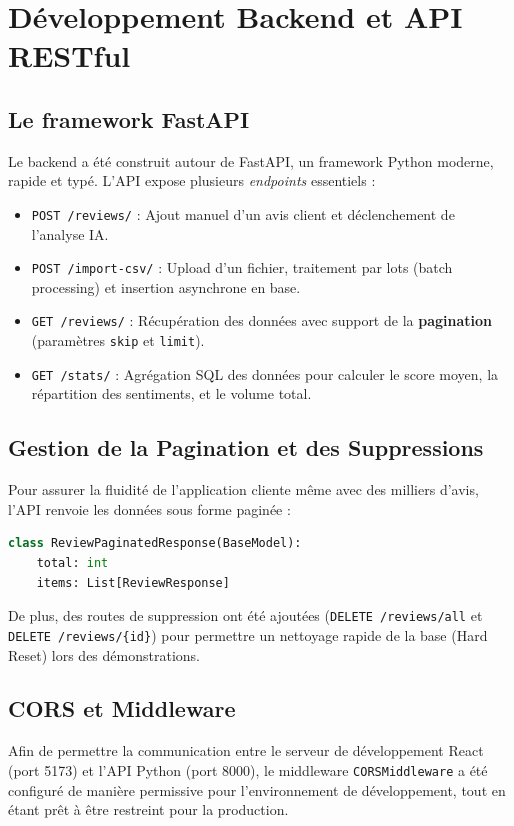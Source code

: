\documentclass[12pt,a4paper]{article}
\begin{document}
\section{Développement Backend et API RESTful}
\subsection{Le framework FastAPI}
Le backend a été construit autour de FastAPI, un framework Python moderne, rapide et typé. L'API expose plusieurs \textit{endpoints} essentiels :
\begin{itemize}
    \item \texttt{POST /reviews/} : Ajout manuel d'un avis client et déclenchement de l'analyse IA.
    \item \texttt{POST /import-csv/} : Upload d'un fichier, traitement par lots (batch processing) et insertion asynchrone en base.
    \item \texttt{GET /reviews/} : Récupération des données avec support de la \textbf{pagination} (paramètres \texttt{skip} et \texttt{limit}).
    \item \texttt{GET /stats/} : Agrégation SQL des données pour calculer le score moyen, la répartition des sentiments, et le volume total.
\end{itemize}

\subsection{Gestion de la Pagination et des Suppressions}
Pour assurer la fluidité de l'application cliente même avec des milliers d'avis, l'API renvoie les données sous forme paginée :
\begin{lstlisting}[language=Python]
class ReviewPaginatedResponse(BaseModel):
    total: int
    items: List[ReviewResponse]
\end{lstlisting}
De plus, des routes de suppression ont été ajoutées (\texttt{DELETE /reviews/all} et \texttt{DELETE /reviews/\{id\}}) pour permettre un nettoyage rapide de la base (Hard Reset) lors des démonstrations.

\subsection{CORS et Middleware}
Afin de permettre la communication entre le serveur de développement React (port 5173) et l'API Python (port 8000), le middleware \texttt{CORSMiddleware} a été configuré de manière permissive pour l'environnement de développement, tout en étant prêt à être restreint pour la production.
\newpage
\end{document}
